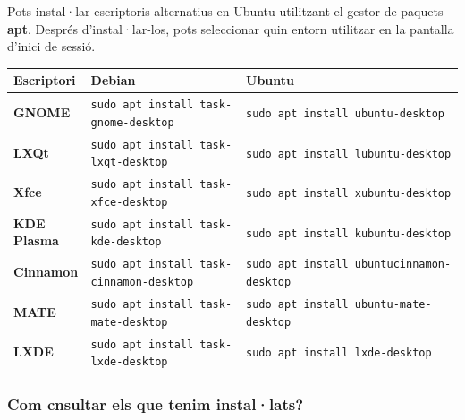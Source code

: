 \documentclass[
  catalan,
  a4paper,
]{article}
\begin{document}
Pots instal·lar escriptoris alternatius en Ubuntu utilitzant el gestor
de paquets \textbf{apt}. Després d'instal·lar-los, pots seleccionar quin
entorn utilitzar en la pantalla d'inici de sessió.

\begin{longtable}[]{@{}
  >{\raggedright\arraybackslash}p{}
  >{\raggedright\arraybackslash}p{}
  >{\raggedright\arraybackslash}p{}@{}}
\toprule\noalign{}
\begin{minipage}[b]{\linewidth}\raggedright
Escriptori
\end{minipage} & \begin{minipage}[b]{\linewidth}\raggedright
Debian
\end{minipage} & \begin{minipage}[b]{\linewidth}\raggedright
Ubuntu
\end{minipage} \\
\midrule\noalign{}
\endhead
\bottomrule\noalign{}
\endlastfoot
\textbf{GNOME} & \texttt{sudo\ apt\ install\ task-gnome-desktop} &
\texttt{sudo\ apt\ install\ ubuntu-desktop} \\
\textbf{LXQt} & \texttt{sudo\ apt\ install\ task-lxqt-desktop} &
\texttt{sudo\ apt\ install\ lubuntu-desktop} \\
\textbf{Xfce} & \texttt{sudo\ apt\ install\ task-xfce-desktop} &
\texttt{sudo\ apt\ install\ xubuntu-desktop} \\
\textbf{KDE Plasma} & \texttt{sudo\ apt\ install\ task-kde-desktop} &
\texttt{sudo\ apt\ install\ kubuntu-desktop} \\
\textbf{Cinnamon} & \texttt{sudo\ apt\ install\ task-cinnamon-desktop} &
\texttt{sudo\ apt\ install\ ubuntucinnamon-desktop} \\
\textbf{MATE} & \texttt{sudo\ apt\ install\ task-mate-desktop} &
\texttt{sudo\ apt\ install\ ubuntu-mate-desktop} \\
\textbf{LXDE} & \texttt{sudo\ apt\ install\ task-lxde-desktop} &
\texttt{sudo\ apt\ install\ lxde-desktop} \\
\end{longtable}

\subsubsection{Com cnsultar els que tenim
instal·lats?}\label{com-cnsultar-els-que-tenim-installats}
\end{document}
